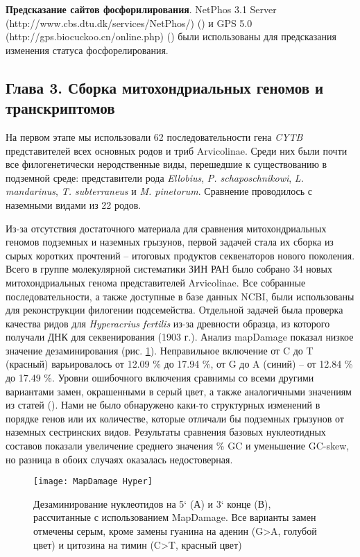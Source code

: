 \textbf{Предсказание сайтов фосфорилирования}. NetPhos 3.1 Server (http://www.cbs.dtu.dk/services/NetPhos/) (\cite{Blom2004}) и GPS 5.0 (http://gps.biocuckoo.cn/online.php) (\cite{Xue2011}) были использованы для предсказания изменения статуса фосфорелирования.


\subsection*{Глава 3. Сборка митохондриальных геномов и транскриптомов}

На первом этапе мы использовали 62 последовательности гена \textit{CYTB} представителей всех основных родов и триб Arvicolinae. Среди них были почти все филогенетически неродственные виды, перешедшие к существованию в подземной среде: представители рода \textit{Ellobius}, \textit{P. schaposchnikowi}, \textit{L. mandarinus}, \textit{T. subterraneus} и \textit{M. pinetorum}. Сравнение проводилось с наземными видами из 22 родов. 

Из-за отсутствия достаточного материала для сравнения митохондриальных геномов подземных и наземных грызунов, первой задачей стала их сборка из сырых коротких прочтений -- итоговых продуктов секвенаторов нового поколения. Всего в группе молекулярной систематики ЗИН РАН было собрано 34 новых митохондриальных генома представителей Arvicolinae. Все собранные последовательности, а также доступные в базе данных NCBI, были использованы для реконструкции филогении подсемейства. Отдельной задачей была проверка качества ридов для \textit{Hyperacrius fertilis} из-за древности образца, из которого получали ДНК для секвенирования (1903 г.). Анализ mapDamage показал низкое значение дезаминирования (рис. \ref{MapDamage}). Неправильное включение от C до T (красный) варьировалось от 12.09 \% до 17.94 \%, от G до A (синий) -- от 12.84 \% до 17.49 \%. Уровни ошибочного включения сравнимы со всеми другими вариантами замен, окрашенными в серый цвет, а также аналогичными значениям из статей (\cite{Molto2017}). Нами не было обнаружено каки-то структурных изменений в порядке генов или их количестве, которые отличали бы подземных грызунов от наземных сестринских видов. Результаты сравнения базовых нуклеотидных составов показали увеличение среднего значения \% GC и уменьшение GC-skew, но разница в обоих случаях оказалась недостоверная.

\begin{figure}[h!]
	\begin{center}
		\texttt{[image: MapDamage Hyper]}
	\end{center}
	\caption{Дезаминирование нуклеотидов на 5` (А) и 3` конце (В), рассчитанные с использованием MapDamage. Все варианты замен отмечены серым, кроме замены гуанина на аденин (G>A, голубой цвет) и цитозина на тимин (C>T, красный цвет)}\label{MapDamage}
\end{figure}

